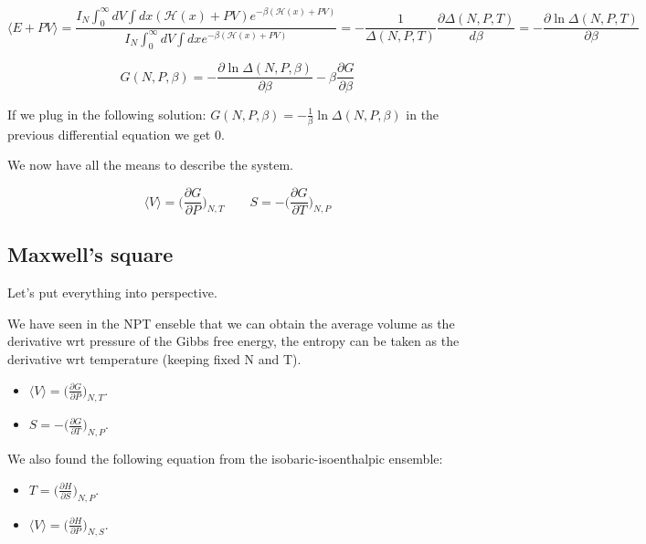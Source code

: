 	$$\langle E + PV\rangle = \frac{I_N\int_0^{\infty} dV\int dx(\mathcal{H}(x) + PV)e^{-\beta(\mathcal{H}(x)+PV)}}{I_N\int_0^{\infty}dV\int dxe^{-\beta(\mathcal{H}(x) + PV)}} = -\frac{1}{\Delta(N, P, T)}\frac{\partial \Delta(N, P, T)}{d\beta} = -\frac{\partial\ln\Delta(N, P, T)}{\partial \beta}$$


	$$G(N, P, \beta) = -\frac{\partial\ln\Delta(N, P, \beta)}{\partial\beta}-\beta\frac{\partial G}{\partial \beta}$$

	If we plug in the following solution: $G(N, P, \beta) = -\frac{1}{\beta}\ln\Delta(N, P, \beta)$ in the previous differential equation we get $0$.

	We now have all the means to describe the system.

	$$\langle V\rangle = \biggl(\frac{\partial G}{\partial P}\biggr)_{N, T}\qquad S = -\biggl(\frac{\partial G}{\partial T}\biggr)_{N, P}$$

	\subsection{Maxwell's square}

	Let's put everything into perspective.

	We have seen in the NPT enseble that we can obtain the average volume as the derivative wrt pressure of the Gibbs free energy, the entropy can be taken as the derivative wrt temperature (keeping fixed N and T).
	\begin{multicols}{2}
		\begin{itemize}
			\item $\langle V\rangle = \biggl(\frac{\partial G}{\partial P}\biggr)_{N, T}$.
			\item $S = -\biggl(\frac{\partial G}{\partial T}\biggr)_{N, P}$.
		\end{itemize}
	\end{multicols}

	We also found the following equation from the isobaric-isoenthalpic ensemble:

	\begin{multicols}{2}
		\begin{itemize}
			\item $T = \biggl(\frac{\partial H}{\partial S}\biggr)_{N, P}$.
			\item $\langle V\rangle = \biggl(\frac{\partial H}{\partial P}\biggr)_{N, S}$.
		\end{itemize}
	\end{multicols}

